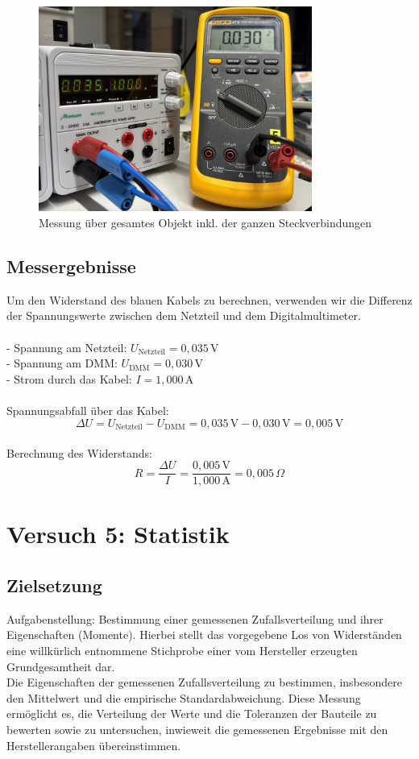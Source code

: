 \documentclass[a4paper,12pt]{article}
\begin{document}
\begin{figure}[H]
    \centering
    \includegraphics[width=0.8\textwidth]{../Quellen/Labor2/Fotos/IMG_3982.jpeg}
\caption{Messung über gesamtes Objekt inkl. der ganzen Steckverbindungen}
\end{figure}

\subsection{Messergebnisse}
Um den Widerstand des blauen Kabels zu berechnen, verwenden wir die Differenz der Spannungswerte zwischen dem Netzteil und dem Digitalmultimeter.\\\\
   - Spannung am Netzteil: \( U_{\text{Netzteil}} = 0,035 \, \text{V} \) \\
   - Spannung am DMM: \( U_{\text{DMM}} = 0,030 \, \text{V} \) \\
   - Strom durch das Kabel: \( I = 1,000 \, \text{A} \) \\\\
Spannungsabfall über das Kabel:
   \[
   \Delta U = U_{\text{Netzteil}} - U_{\text{DMM}} = 0,035 \, \text{V} - 0,030 \, \text{V} = 0,005 \, \text{V}
   \]\\
Berechnung des Widerstands:
   \[
   R = \frac{\Delta U}{I} = \frac{0,005 \, \text{V}}{1,000 \, \text{A}} = 0,005 \, \Omega
   \]

\newpage
\section{Versuch 5: Statistik}
\subsection{Zielsetzung}
Aufgabenstellung: Bestimmung einer gemessenen Zufallsverteilung und ihrer Eigenschaften (Momente). Hierbei stellt
das vorgegebene Los von Widerständen eine willkürlich entnommene Stichprobe einer vom
Hersteller erzeugten Grundgesamtheit dar.\\
\noindent Die Eigenschaften der gemessenen Zufallsverteilung zu bestimmen, insbesondere den Mittelwert und die empirische Standardabweichung. Diese Messung ermöglicht es, die Verteilung der Werte und die Toleranzen der Bauteile zu bewerten sowie zu untersuchen, inwieweit die gemessenen Ergebnisse mit den Herstellerangaben übereinstimmen.
\end{document}
